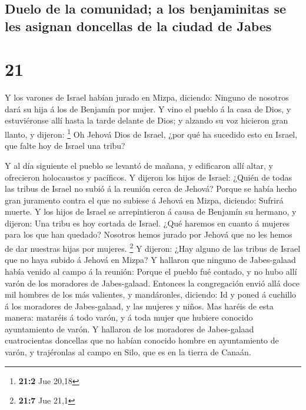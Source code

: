 \hypertarget{duelo-de-la-comunidad-a-los-benjaminitas-se-les-asignan-doncellas-de-la-ciudad-de-jabes}{%
\subsection{Duelo de la comunidad; a los benjaminitas se les asignan
doncellas de la ciudad de
Jabes}\label{duelo-de-la-comunidad-a-los-benjaminitas-se-les-asignan-doncellas-de-la-ciudad-de-jabes}}

\hypertarget{section-20}{%
\section{21}\label{section-20}}

 Y los varones de Israel habían jurado en Mizpa, diciendo:
Ninguno de nosotros dará su hija á los de Benjamín por mujer.
 Y vino el pueblo á la casa de Dios, y estuviéronse allí
hasta la tarde delante de Dios; y alzando su voz hicieron gran llanto, y
dijeron: \footnote{\textbf{21:2} Jue 20,18}  Oh Jehová
Dios de Israel, ¿por qué ha sucedido esto en Israel, que falte hoy de
Israel una tribu?

 Y al día siguiente el pueblo se levantó de mañana, y
edificaron allí altar, y ofrecieron holocaustos y pacíficos.
 Y dijeron los hijos de Israel: ¿Quién de todas las tribus
de Israel no subió á la reunión cerca de Jehová? Porque se había hecho
gran juramento contra el que no subiese á Jehová en Mizpa, diciendo:
Sufrirá muerte.  Y los hijos de Israel se arrepintieron á
causa de Benjamín su hermano, y dijeron: Una tribu es hoy cortada de
Israel.  ¿Qué haremos en cuanto á mujeres para los que han
quedado? Nosotros hemos jurado por Jehová que no les hemos de dar
nuestras hijas por mujeres. \footnote{\textbf{21:7} Jue 21,1}
 Y dijeron: ¿Hay alguno de las tribus de Israel que no
haya subido á Jehová en Mizpa? Y hallaron que ninguno de Jabes-galaad
había venido al campo á la reunión:  Porque el pueblo fué
contado, y no hubo allí varón de los moradores de Jabes-galaad.
 Entonces la congregación envió allá doce mil hombres de
los más valientes, y mandáronles, diciendo: Id y poned á cuchillo á los
moradores de Jabes-galaad, y las mujeres y niños.  Mas
haréis de esta manera: mataréis á todo varón, y á toda mujer que hubiere
conocido ayuntamiento de varón.  Y hallaron de los
moradores de Jabes-galaad cuatrocientas doncellas que no habían conocido
hombre en ayuntamiento de varón, y trajéronlas al campo en Silo, que es
en la tierra de Canaán.

